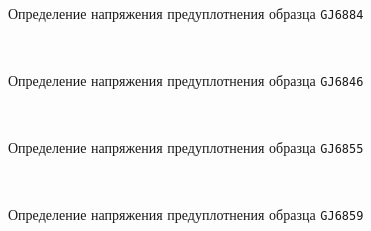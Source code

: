     \begin{figure}
        {\centering
        \small
            \hfill 
            \\
            \hfill  
            \hfill 
        }
        \caption{Определение напряжения предуплотнения образца \texttt{GJ6884}}
        \label{img:6884}
    \end{figure}
    
    \begin{figure}
        {\centering
        \small
            \hfill 
            \\
            \hfill  
            \hfill  
            }
            \caption{Определение напряжения предуплотнения образца \texttt{GJ6846}}
            \label{img:6846}
    \end{figure}
    
    \begin{figure}
        {\centering
            \small
            \hfill 
            \\
            \hfill  
            \hfill  
            }
            \caption{Определение напряжения предуплотнения образца \texttt{GJ6855}}
            \label{img:6855}
    \end{figure}
    
    \begin{figure}
        {\centering
            \small
            \hfill 
            \\
            \hfill   
            \hfill 
            }
            \caption{Определение напряжения предуплотнения образца \texttt{GJ6859}}
            \label{img:6859}
    \end{figure}
        
